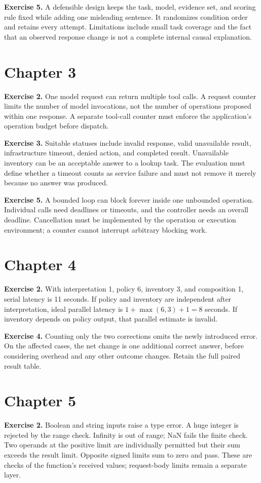 \textbf{Exercise 5.} A defensible design keeps the task, model, evidence set, and scoring rule fixed while adding one misleading sentence. It randomizes condition order and retains every attempt. Limitations include small task coverage and the fact that an observed response change is not a complete internal causal explanation.

\section{Chapter 3}
\textbf{Exercise 2.} One model request can return multiple tool calls. A request counter limits the number of model invocations, not the number of operations proposed within one response. A separate tool-call counter must enforce the application's operation budget before dispatch.

\textbf{Exercise 3.} Suitable statuses include invalid response, valid unavailable result, infrastructure timeout, denied action, and completed result. Unavailable inventory can be an acceptable answer to a lookup task. The evaluation must define whether a timeout counts as service failure and must not remove it merely because no answer was produced.

\textbf{Exercise 5.} A bounded loop can block forever inside one unbounded operation. Individual calls need deadlines or timeouts, and the controller needs an overall deadline. Cancellation must be implemented by the operation or execution environment; a counter cannot interrupt arbitrary blocking work.

\section{Chapter 4}
\textbf{Exercise 2.} With interpretation 1, policy 6, inventory 3, and composition 1, serial latency is 11 seconds. If policy and inventory are independent after interpretation, ideal parallel latency is \(1+\max(6,3)+1=8\) seconds. If inventory depends on policy output, that parallel estimate is invalid.

\textbf{Exercise 4.} Counting only the two corrections omits the newly introduced error. On the affected cases, the net change is one additional correct answer, before considering overhead and any other outcome changes. Retain the full paired result table.

\section{Chapter 5}
\textbf{Exercise 2.} Boolean and string inputs raise a type error. A huge integer is rejected by the range check. Infinity is out of range; NaN fails the finite check. Two operands at the positive limit are individually permitted but their sum exceeds the result limit. Opposite signed limits sum to zero and pass. These are checks of the function's received values; request-body limits remain a separate layer.

